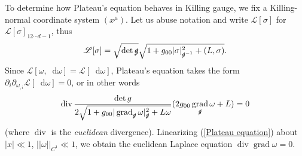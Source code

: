 \documentclass[reqno,12pt,letterpaper]{amsart}
\newcommand*\dif{\mathop{}\!\mathrm{d}}
\DeclareMathOperator{\Div}{div}
\DeclareMathOperator{\grad}{grad}
\newcommand{\Lagrange}{\mathscr L}
\theoremstyle{definition}
\numberwithin{equation}{section}
\begin{document}
To determine how Plateau's equation behaves in Killing gauge, we fix a Killing-normal coordinate system $(x^\mu)$.
Let us abuse notation and write $\Lagrange[\sigma]$ for $\Lagrange[\sigma]_{12\cdots d - 1}$, thus
\begin{equation}\label{Lagrangian in coords}
\Lagrange[\sigma] = \sqrt{\det \slashed g} \sqrt{1 + g_{00} |\sigma|_{\slashed g^{-1}}^2 + (L, \sigma)}.
\end{equation}
Since $\Lagrange[\omega, \dif \omega] = \Lagrange[\dif \omega]$, Plateau's equation takes the form $\partial_i \partial_{\omega_{,i}} \Lagrange[\dif \omega] = 0$, or in other words
\begin{equation}\label{Plateau equation}
\Div \frac{\det g}{2 \sqrt{1 + g_{00}|\grad_{\slashed g} \omega|_{\slashed g}^2 + L\omega}}(2g_{00} \grad_{\slashed g} \omega + L) = 0
\end{equation}
(where $\Div$ is the \emph{euclidean} divergence). Linearizing (\ref{Plateau equation}) about $|x| \ll 1$, $||\omega||_{C^1} \ll 1$, we obtain the euclidean Laplace equation $\Div \grad \omega = 0$.
\end{document}

